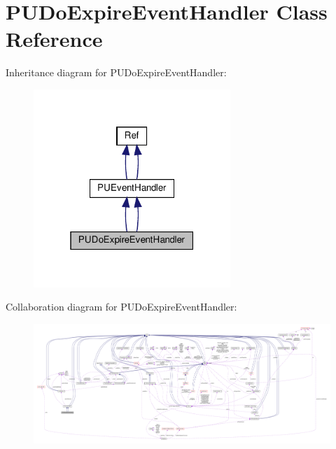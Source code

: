 \hypertarget{classPUDoExpireEventHandler}{}\section{P\+U\+Do\+Expire\+Event\+Handler Class Reference}
\label{classPUDoExpireEventHandler}


Inheritance diagram for P\+U\+Do\+Expire\+Event\+Handler\+:
\nopagebreak
\begin{figure}[H]
\begin{center}
\leavevmode
\includegraphics[width=211pt]{classPUDoExpireEventHandler__inherit__graph}
\end{center}
\end{figure}


Collaboration diagram for P\+U\+Do\+Expire\+Event\+Handler\+:
\nopagebreak
\begin{figure}[H]
\begin{center}
\leavevmode
\includegraphics[width=350pt]{classPUDoExpireEventHandler__coll__graph}
\end{center}
\end{figure}
